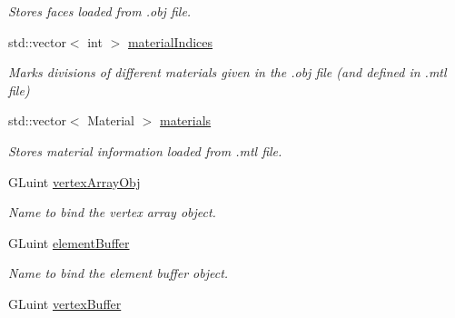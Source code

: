 \begin{DoxyCompactItemize}
\begin{DoxyCompactList}\small\item\em Stores faces loaded from .obj file. \end{DoxyCompactList}\item 
std\+::vector$<$ int $>$ \hyperlink{class_obj_g_p_u_data_ab372a052982848b3f1b4d9b316d8d2b5}{material\+Indices}\hypertarget{class_obj_g_p_u_data_ab372a052982848b3f1b4d9b316d8d2b5}{}\label{class_obj_g_p_u_data_ab372a052982848b3f1b4d9b316d8d2b5}

\begin{DoxyCompactList}\small\item\em Marks divisions of different materials given in the .obj file (and defined in .mtl file) \end{DoxyCompactList}\item 
std\+::vector$<$ Material $>$ \hyperlink{class_obj_g_p_u_data_acfdaa154dbbb2b23512b4f65ec1ac708}{materials}\hypertarget{class_obj_g_p_u_data_acfdaa154dbbb2b23512b4f65ec1ac708}{}\label{class_obj_g_p_u_data_acfdaa154dbbb2b23512b4f65ec1ac708}

\begin{DoxyCompactList}\small\item\em Stores material information loaded from .mtl file. \end{DoxyCompactList}\item 
G\+Luint \hyperlink{class_obj_g_p_u_data_a723846f0ce483bd69094834e18e17e13}{vertex\+Array\+Obj}\hypertarget{class_obj_g_p_u_data_a723846f0ce483bd69094834e18e17e13}{}\label{class_obj_g_p_u_data_a723846f0ce483bd69094834e18e17e13}

\begin{DoxyCompactList}\small\item\em Name to bind the vertex array object. \end{DoxyCompactList}\item 
G\+Luint \hyperlink{class_obj_g_p_u_data_a64363bc12d8082f77948946d2542a89b}{element\+Buffer}\hypertarget{class_obj_g_p_u_data_a64363bc12d8082f77948946d2542a89b}{}\label{class_obj_g_p_u_data_a64363bc12d8082f77948946d2542a89b}

\begin{DoxyCompactList}\small\item\em Name to bind the element buffer object. \end{DoxyCompactList}\item 
G\+Luint \hyperlink{class_obj_g_p_u_data_ac89933479b0d8929860ee7317a4bdfdf}{vertex\+Buffer}\hypertarget{class_obj_g_p_u_data_ac89933479b0d8929860ee7317a4bdfdf}{}\label{class_obj_g_p_u_data_ac89933479b0d8929860ee7317a4bdfdf}


\end{DoxyCompactItemize}
